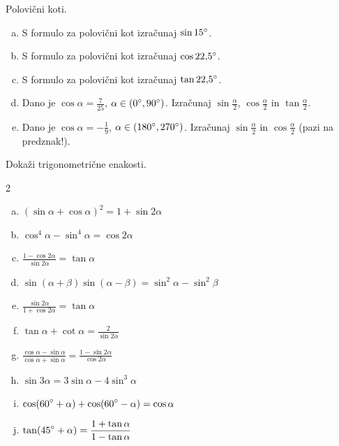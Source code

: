 \documentclass[a4paper,12pt]{letter}
\newcounter{tocke}
\begin{document}
\begin{naloga}[\hfill $\tockeC$] \addtocounter{tocke}{\numexpr\tockeC\relax}
Polovi\v{c}ni koti.
\begin{enumerate}[a)]
\item S formulo za polovi\v{c}ni kot izra\v{c}unaj $\sin15\degree$.
\item S formulo za polovi\v{c}ni kot izra\v{c}unaj $\cos22{,}5\degree$.
\item S formulo za polovi\v{c}ni kot izra\v{c}unaj $\tan22{,}5\degree$.
\item Dano je $\cos\alpha=\frac{7}{25}$, $\alpha\in(0\degree,90\degree)$. Izra\v{c}unaj $\sin\frac{\alpha}{2}$, $\cos\frac{\alpha}{2}$ in $\tan\frac{\alpha}{2}$.
\item Dano je $\cos\alpha=-\frac19$, $\alpha\in(180\degree,270\degree)$. Izra\v{c}unaj $\sin\frac{\alpha}{2}$ in $\cos\frac{\alpha}{2}$ (pazi na predznak!).
\end{enumerate}
\end{naloga}
\newpage

\begin{naloga}[\hfill $\tockeD$] \addtocounter{tocke}{\numexpr\tockeD\relax}
Doka\v{z}i trigonometri\v{c}ne enakosti.
\begin{multicols}{2}
\begin{enumerate}[a)]
\item $\displaystyle (\sin\alpha+\cos\alpha)^2=1+\sin2\alpha$
\item $\displaystyle \cos^4\alpha-\sin^4\alpha=\cos2\alpha$
\item $\displaystyle \frac{1-\cos2\alpha}{\sin2\alpha}=\tan\alpha$
\item $\displaystyle \sin(\alpha+\beta)\sin(\alpha-\beta)=\sin^2\alpha-\sin^2\beta$
\item $\displaystyle \frac{\sin2\alpha}{1+\cos2\alpha}=\tan\alpha$
\end{enumerate}
\columnbreak
\begin{enumerate}[a)]\setcounter{enumi}{5}
\item $\displaystyle \tan\alpha+\cot\alpha=\frac{2}{\sin2\alpha}$
\item $\displaystyle \frac{\cos\alpha-\sin\alpha}{\cos\alpha+\sin\alpha}=\frac{1-\sin2\alpha}{\cos2\alpha}$
\item $\displaystyle \sin3\alpha=3\sin\alpha-4\sin^3\alpha$
\item $\displaystyle \cos(60\degree+\alpha)+\cos(60\degree-\alpha)=\cos\alpha$
\item $\displaystyle \tan(45\degree+\alpha)=\frac{1+\tan\alpha}{1-\tan\alpha}$
\end{enumerate}
\end{multicols}
\end{naloga}
\end{document}
